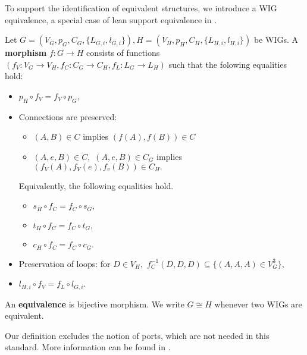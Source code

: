 To support the identification of equivalent structures, we introduce a WIG equivalence, a special case of lean support equivalence in \cite{jensen-milner-bigraph}.
\begin{definition}
  Let $G = (V_{G}, p_{G}, C_{G}, \{L_{G, i}, l_{G, i}\}), H = (V_{H}, p_{H}, C_{H}, \{L_{H, i}, l_{H, i}\})$ be WIGs. A \textbf{morphism} $f: G \to H$ consists of functions $(f_{V}: V_{G} \to V_{H}, f_{C}: C_{G} \to C_{H}, f_{L}: L_{G} \to L_{H})$ such that the folowing equalities hold:
  \begin{itemize}
    \item $p_{H} \circ f_{V} = f_{V} \circ p_{G},$
    \item Connections are preserved:
    \begin{itemize}
      \item $(A, B) \in C$ implies $(f(A), f(B)) \in C$
      \item $(A, e, B) \in C,$ $(A, e, B) \in C_{G}$ implies $(f_{V}(A), f_{V}(e), f_{v}(B)) \in C_{H}.$
    \end{itemize}
    Equivalently, the following equalities hold.
    \begin{itemize}
      \item $s_{H} \circ f_{C} = f_{C} \circ s_{G},$
      \item $t_{H} \circ f_{C} = f_{C} \circ t_{G},$
      \item $c_{H} \circ f_{C} = f_{C} \circ c_{G}.$
    \end{itemize}
    \item Preservation of loops: for $D \in V_{H},$ $f_{C}^{-1}(D, D, D) \subseteq \{(A, A, A) \in V^{3}_{G}\},$
    \item $l_{H, i} \circ f_{V} = f_{L} \circ l_{G,i}.$
  \end{itemize}
  An \textbf{equivalence} is bijective morphism. We write $G \cong H$ whenever two WIGs are equivalent.
\end{definition}
Our definition excludes the notion of ports, which are not needed in this standard. More information can be found in \cite{jensen-milner-bigraph}.



